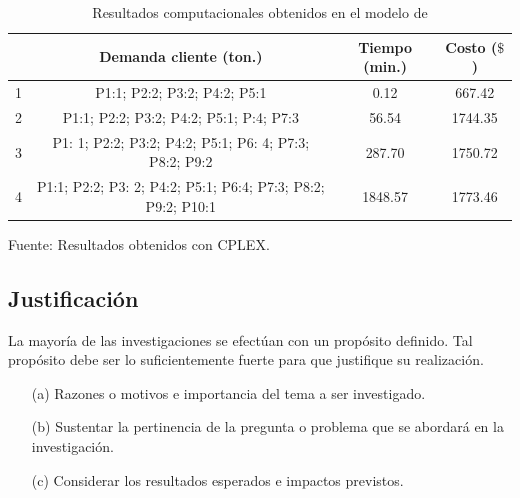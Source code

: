 \documentclass[a4paper, 12pt]{article}
\begin{document}
\begin{table}[h!]
\begin{center}
\caption{\small{Resultados computacionales obtenidos en el modelo de \cite{Sterle}}}
\end{center}
\vskip -0.7cm
\begin{tabular}{cccc} \toprule %
\hline 
\rowcolor{LightBlue2}{\small Escenarios} & {\small Demanda cliente (ton.)} & {\small Tiempo (min.)} & {\small Costo ($\$$)} \\ \hline 
{\small 1} & {\small P1:1; P2:2; P3:2; P4:2; P5:1} & {\small 0.12} & {\small 667.42} \\ \hline 
{\small 2} & {\small P1:1; P2:2; P3:2; P4:2; P5:1; P:4; P7:3} & {\small 56.54} & {\small 1744.35} \\ \hline 
{\small 3} & {\small P1: 1; P2:2; P3:2; P4:2; P5:1; P6: 4; P7:3; P8:2; P9:2} & {\small 287.70} & {\small 1750.72} \\  \hline 
{\small 4} & {\small P1:1; P2:2; P3: 2; P4:2; P5:1; P6:4; P7:3; P8:2; P9:2; P10:1} & {\small 1848.57} & {\small 1773.46} \\   \bottomrule \hline 
\end{tabular} 
\begin{center}
\vskip -0.2cm
{\small{Fuente: Resultados obtenidos con CPLEX.}}
\end{center}
\end{table}



\subsection{Justificación}
La mayoría de las investigaciones se efectúan con un propósito definido. Tal propósito debe ser lo suficientemente fuerte para que justifique su realización. \cite{Erica}  

\begin{enumerate}
\item[(a)] Razones o motivos e importancia del tema a ser investigado. 
\item[(b)]Sustentar la pertinencia de la pregunta o problema que se abordará en la investigación.
\item[(c)]Considerar los resultados esperados e impactos previstos.
\end{enumerate}
\end{document}
